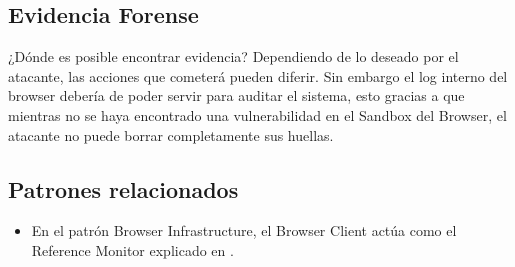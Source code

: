 \subsection{Evidencia Forense}
	¿Dónde es posible encontrar evidencia?
	Dependiendo de lo deseado por el atacante, las acciones que cometerá pueden diferir. Sin embargo el log interno del browser debería de poder servir para auditar el sistema, esto gracias a que mientras no se haya encontrado una vulnerabilidad en el Sandbox del Browser, el atacante no puede borrar completamente sus huellas.

\subsection{Patrones relacionados}
	\begin{itemize}
		\item En el patrón Browser Infrastructure, el Browser Client actúa como el Reference Monitor explicado en \cite{fernandez2001pattern}.
	\end{itemize}

